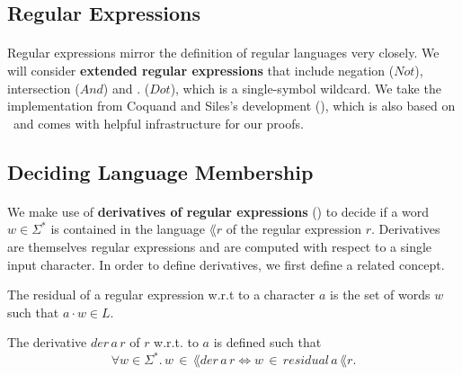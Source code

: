 \documentclass[11pt,a4paper,oneside]{book}
\begin{document}
        \subsection{Regular Expressions}

                \paragraph{} 
                Regular expressions mirror the definition of regular languages very closely. 
                We will consider \textbf{extended regular expressions} that include negation ($Not$), intersection ($And$) and $.$ ($Dot$), which is a single-symbol wildcard. 
                We take the implementation from Coquand and Siles's development (\cite{DBLP:conf/cpp/CoquandS11}), which is also based on \ssreflect\ and comes with helpful infrastructure for our proofs.



                \subsection{Deciding Language Membership}
                    \paragraph{}
                        We make use of \textbf{derivatives of regular expressions} (\cite{DBLP:journals/jacm/Brzozowski64}) to decide if a word $w \in \Sigma^*$ is contained in the language $\lang{r}$ of the regular expression $r$. 
                        Derivatives are themselves regular expressions and are computed with respect to a single input character. 
                        In order to define derivatives, we first define a related concept.

                    \begin{definition}{}
                        \label{residual}
                        The residual of a regular expression w.r.t to a character $a$ is the set of words $w$ such that $a \cdot w \in L$.
                    \end{definition}

                    \begin{definition}{}
                        \label{residual}
                        The derivative $der \,  a \, r$ of $r$ w.r.t. to $a$ is defined such that 
                        \[
                            \forall w \in \Sigma^*. \, w \, \in \, \lang{der \, a \, r} \Leftrightarrow w \, \in \, residual \, a \, \lang{r}.
                        \]
                    \end{definition}
\end{document}
